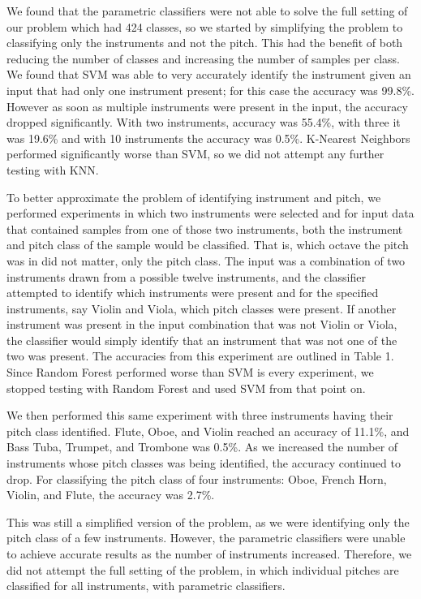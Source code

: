 \documentclass{article}
\begin{document}
We found that the parametric classifiers were not able to solve the full setting of our problem which had 424 classes, so we started by simplifying the problem to classifying only the instruments and not the pitch. This had the benefit of both reducing the number of classes and increasing the number of samples per class. We found that SVM was able to very accurately identify the instrument given an input that had only one instrument present; for this case the accuracy was 99.8\%. However as soon as multiple instruments were present in the input, the accuracy dropped significantly. With two instruments, accuracy was 55.4\%, with three it was 19.6\% and with 10 instruments the accuracy was 0.5\%. K-Nearest Neighbors performed significantly worse than SVM, so we did not attempt any further testing with KNN.

To better approximate the problem of identifying instrument and pitch, we performed experiments in which two instruments were selected and for input data that contained samples from one of those two instruments, both the instrument and pitch class of the sample would be classified. That is, which octave the pitch was in did not matter, only the pitch class. The input was a combination of two instruments drawn from a possible twelve instruments, and the classifier attempted to identify which instruments were present and for the specified instruments, say Violin and Viola, which pitch classes were present. If another instrument was present in the input combination that was not Violin or Viola, the classifier would simply identify that an instrument that was not one of the two was present. The accuracies from this experiment are outlined in Table 1. Since Random Forest performed worse than SVM is every experiment, we stopped testing with Random Forest and used SVM from that point on.

We then performed this same experiment with three instruments having their pitch class identified. Flute, Oboe, and Violin reached an accuracy of 11.1\%, and Bass Tuba, Trumpet, and Trombone was 0.5\%. As we increased the number of instruments whose pitch classes was being identified, the accuracy continued to drop. For classifying the pitch class of four instruments: Oboe, French Horn, Violin, and Flute, the accuracy was 2.7\%.

This was still a simplified version of the problem, as we were identifying only the pitch class of a few instruments. However, the parametric classifiers were unable to achieve accurate results as the number of instruments increased. Therefore, we did not attempt the full setting of the problem, in which individual pitches are classified for all instruments, with parametric classifiers. 
\end{document}
